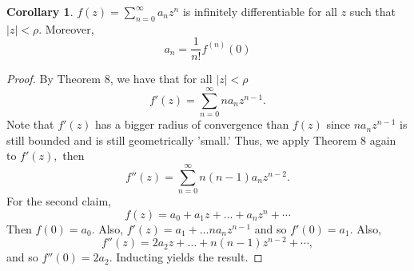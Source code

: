 \documentclass[10pt, oneside]{article}
\theoremstyle{definition}
\newtheorem{cor}{Corollary}
\begin{document}
\begin{cor}
    $f(z) = \sum_{n=0}^\infty a_n z^n$ is infinitely differentiable for all $z$ such that $|z| < \rho.$ Moreover, 
    \[a_n = \frac{1}{n!}f^{(n)}(0)\]
\end{cor}
\begin{proof}
    By Theorem 8, we have that for all $|z| < \rho$
    \[f'(z) = \sum_{n=0}^\infty n a_n z^{n-1}.\] Note that $f'(z)$ has a bigger radius of convergence than $f(z)$ since $na_n z^{n-1}$ is still bounded and is still geometrically 'small.' Thus, we apply Theorem 8 again to $f'(z),$ then 
    \[f''(z) = \sum_{n=0}^\infty n(n-1)a_n z^{n-2}.\] For the second claim, 
    \[f(z) = a_0 + a_1z + \dots +  a_nz^n + \cdots\] Then $f(0) = a_0.$ Also, $f'(z) = a_1 
 + \dots na_n z^{n-1}$ and so $f'(0) = a_1.$ Also, 
 \[f''(z) = 2a_2z + \dots  + n(n-1)z^{n-2} + \cdots,\] and so $f''(0) = 2a_2.$ Inducting yields the result.
\end{proof}

\newpage
\end{document}
